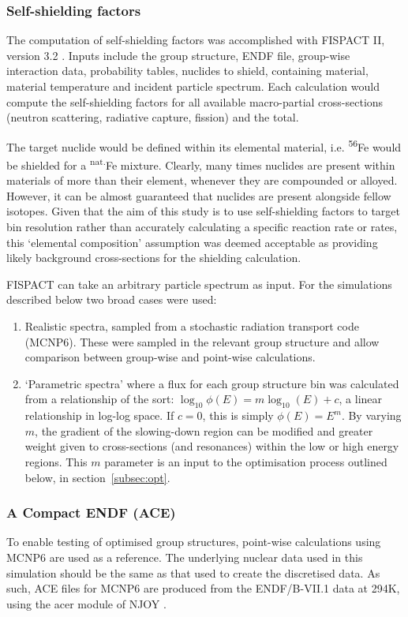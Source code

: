 \subsubsection{Self-shielding factors}
The computation of self-shielding factors was accomplished with FISPACT II, version 3.2 \cite{sublet2017a}. Inputs include the group structure, ENDF file, group-wise interaction data, probability tables, nuclides to shield, containing material, material temperature and incident particle spectrum. Each calculation would compute the self-shielding factors for all available macro-partial cross-sections (neutron scattering, radiative capture, fission) and the total. 

The target nuclide would be defined within its elemental material, i.e. \textsuperscript{56}Fe would be shielded for a \textsuperscript{nat.}Fe mixture. Clearly, many times nuclides are present within materials of more than their element, whenever they are compounded or alloyed. However, it can be almost guaranteed that nuclides are present alongside fellow isotopes. Given that the aim of this study is to use self-shielding factors to target bin resolution rather than accurately calculating a specific reaction rate or rates, this `elemental composition' assumption was deemed acceptable as providing likely background cross-sections for the shielding calculation. 

FISPACT can take an arbitrary particle spectrum as input. For the simulations described below two broad cases were used: 

\begin{enumerate}
  \item Realistic spectra, sampled from a stochastic radiation transport code (MCNP6). These were sampled in the relevant group structure and allow comparison between group-wise and point-wise calculations. 
  \item `Parametric spectra' where a flux for each group structure bin was calculated from a relationship of the sort: $\log_{10}\phi(E) = m\log_{10}(E) + c$, a linear relationship in log-log space. If $c = 0$, this is simply $\phi(E) = E^{m}$. By varying $m$, the gradient of the slowing-down region can be modified and greater weight given to cross-sections (and resonances) within the low or high energy regions. This $m$ parameter is an input to the optimisation process outlined below, in section~\ref{subsec:opt}.
\end{enumerate}

\subsubsection{A Compact ENDF (ACE)}
To enable testing of optimised group structures, point-wise calculations using MCNP6 are used as a reference. The underlying nuclear data used in this simulation should be the same as that used to create the discretised data. As such, ACE files for MCNP6 are produced from the ENDF/B-VII.1 data at 294K, using the acer module of NJOY \cite{MacFarlane2016}.

